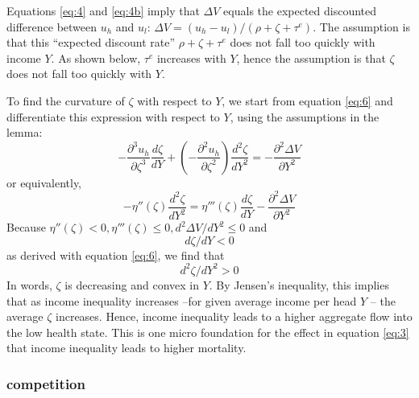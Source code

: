 \documentclass[a4paper,12pt]{article}
\begin{document}
Equations \eqref{eq:4} and \eqref{eq:4b} imply that \(\Delta V\) equals the expected discounted difference between \(u_h\) and \(u_l\): \(\Delta V = (u_h-u_l)/(\rho+\zeta+\tau^e)\). The assumption is that this ``expected discount rate'' \(\rho+\zeta+\tau^e\) does not fall too quickly with income \(Y\). As shown below, \(\tau^e\) increases with \(Y\), hence the assumption is that \(\zeta\) does not fall too quickly with \(Y\).

To find the curvature of \(\zeta\) with respect to \(Y\), we start from equation \eqref{eq:6} and differentiate this expression with respect to \(Y\), using the assumptions in the lemma:
\begin{equation}
\label{eq:33}
-\frac{\partial^3 u_h}{\partial \zeta^3} \frac{d\zeta}{dY} + \left(-\frac{\partial^2 u_h}{\partial \zeta^2} \right) \frac{d^2 \zeta}{dY^2} = - \frac{\partial^2 \Delta V}{\partial Y^2}
\end{equation}
or equivalently,
\begin{equation}
\label{eq:34}
- \eta''(\zeta) \frac{d^2 \zeta}{dY^2} = \eta'''(\zeta) \frac{d\zeta}{dY} - \frac{\partial^2 \Delta V}{\partial Y^2}
\end{equation}
Because \(\eta''(\zeta) <0, \eta'''(\zeta) \leq 0, d^2 \Delta V/dY^2 \leq 0\) and
\begin{equation}
\label{eq:40}
    d\zeta/dY < 0
\end{equation}
as derived with equation \eqref{eq:6}, we find that
\begin{equation}
\label{eq:30}
d^2 \zeta/dY^2 >0
\end{equation}
In words, \(\zeta\) is decreasing and convex in \(Y\). By Jensen's inequality, this implies that as income inequality increases --for given average income per head \(Y\) -- the average \(\zeta\) increases. Hence, income inequality leads to a higher aggregate flow into the low health state. This is one micro foundation for the effect in equation \eqref{eq:3} that income inequality leads to higher mortality.


\subsubsection{competition}
\label{sec:org63e5c28}
\end{document}

